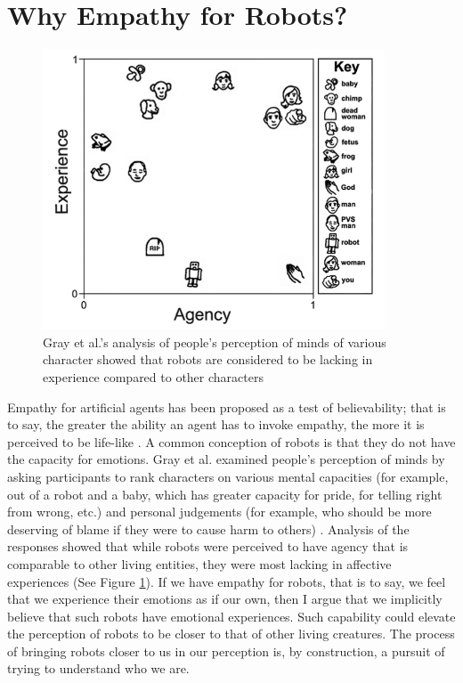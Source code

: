 \section{Why Empathy for Robots?}


   \begin{figure}[thpb]
      \centering
      \includegraphics[width=4in]{figures/intro/gray_dimensions_mind.png}
      \caption{Gray et al.'s analysis of people's perception of minds of various character showed that robots are considered to be lacking in experience compared to other characters \cite{gray_dimensions_mind}}
      \label{fig_intro_gray}
   \end{figure}
   

Empathy for artificial agents has been proposed as a test of believability; that is to say, the greater the ability an agent has to invoke empathy, the more it is perceived  to be life-like \cite{paiva_empathic_virtual_agents}. A common conception of robots is that they do not have the capacity for emotions. Gray et al. examined people's perception of minds by asking participants to rank characters on various mental capacities (for example, out of a robot and a baby, which has greater capacity for pride, for telling right from wrong, etc.) and personal judgements (for example, who should be more deserving of blame if they were to cause harm to others) \cite{gray_dimensions_mind}.  Analysis of the responses showed that while robots were perceived to have agency that is comparable to other living entities, they were most lacking in affective experiences (See Figure \ref{fig_intro_gray}).  If we have empathy for robots, that is to say, we feel that we experience their emotions as if our own, then I argue that we implicitly believe that such robots have emotional experiences. Such capability could elevate the perception of robots to be closer to that of other living creatures. The process of bringing robots closer to us in our perception is, by construction, a pursuit of trying to understand who we are. 



